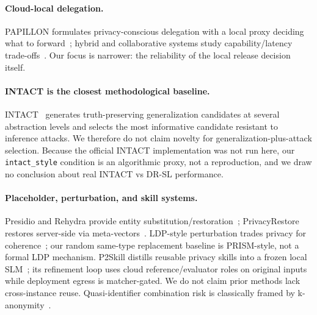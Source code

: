 \documentclass[11pt,a4paper]{article}
\begin{document}
\paragraph{Cloud-local delegation.} PAPILLON formulates privacy-conscious delegation with a local proxy deciding what to forward~\cite{siyan2025papillon}; hybrid and collaborative systems study capability/latency trade-offs~\cite{hao2024hybrid,jin2025cecollm,li2025collab}. Our focus is narrower: the reliability of the local release decision itself.

\paragraph{INTACT is the closest methodological baseline.} INTACT~\cite{pilan2025truthful} generates truth-preserving generalization candidates at several abstraction levels and selects the most informative candidate resistant to inference attacks. We therefore do not claim novelty for generalization-plus-attack selection. Because the official INTACT implementation was not run here, our \texttt{intact\_style} condition is an algorithmic proxy, not a reproduction, and we draw no conclusion about real INTACT vs DR-SL performance.

\paragraph{Placeholder, perturbation, and skill systems.} Presidio and Rehydra provide entity substitution/restoration~\cite{presidio,rehydra}; PrivacyRestore restores server-side via meta-vectors~\cite{zeng2025privacyrestore}. LDP-style perturbation trades privacy for coherence~\cite{mai2023split,shi2022selective,duchi2013local,yue2021santext}; our random same-type replacement baseline is PRISM-style, not a formal LDP mechanism. P2Skill distills reusable privacy skills into a frozen local SLM~\cite{ryu2026p2skill}; its refinement loop uses cloud reference/evaluator roles on original inputs while deployment egress is matcher-gated. We do not claim prior methods lack cross-instance reuse. Quasi-identifier combination risk is classically framed by k-anonymity~\cite{sweeney2002k}.
\end{document}
